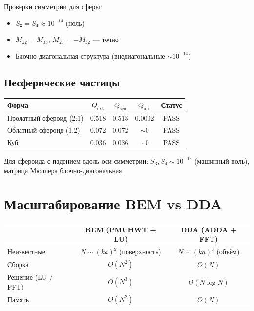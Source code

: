 \documentclass[12pt,a4paper]{article}
\begin{document}
Проверки симметрии для сферы:
\begin{itemize}
  \item $S_3 = S_4 \approx 10^{-14}$ (ноль)
  \item $M_{22} = M_{33}$, $M_{23} = -M_{32}$ --- точно
  \item Блочно-диагональная структура (внедиагональные $\sim 10^{-14}$)
\end{itemize}

\subsection{Несферические частицы}

\begin{center}
\begin{tabular}{lcccc}
\toprule
Форма & $Q_{\mathrm{ext}}$ & $Q_{\mathrm{sca}}$ & $Q_{\mathrm{abs}}$ & Статус \\
\midrule
Пролатный сфероид (2:1) & 0.518 & 0.518 & 0.0002 & PASS \\
Облатный сфероид (1:2) & 0.072 & 0.072 & $\sim$0 & PASS \\
Куб & 0.036 & 0.036 & $\sim$0 & PASS \\
\bottomrule
\end{tabular}
\end{center}

Для сфероида с падением вдоль оси симметрии: $S_3, S_4 \sim 10^{-13}$ (машинный ноль), матрица Мюллера блочно-диагональная.


\section{Масштабирование BEM vs DDA}

\begin{center}
\begin{tabular}{lcc}
\toprule
& BEM (PMCHWT + LU) & DDA (ADDA + FFT) \\
\midrule
Неизвестные & $N \sim (ka)^2$ (поверхность) & $N \sim (ka)^3$ (объём) \\
Сборка & $O(N^2)$ & $O(N)$ \\
Решение (LU / FFT) & $O(N^3)$ & $O(N \log N)$ \\
Память & $O(N^2)$ & $O(N)$ \\
\bottomrule
\end{tabular}
\end{center}
\end{document}
